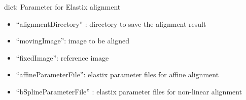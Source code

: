 \documentclass[letterpaper,10pt,english]{sphinxmanual}
\begin{document}
\begin{fulllineitems}
\label{api/ClearMap.Parameter:ClearMap.Parameter.AlignmentParameter}
dict: Parameter for Elastix alignment
\begin{itemize}
\item {} 
``alignmentDirectory'' : directory to save the alignment result

\item {} 
``movingImage'': image to be aligned

\item {} 
``fixedImage'':  reference image

\item {} 
``affineParameterFile'': elastix parameter files for affine alignment

\item {} 
``bSplineParameterFile'' : elastix parameter files for non-linear alignment

\end{itemize}







\end{fulllineitems}

\end{document}
